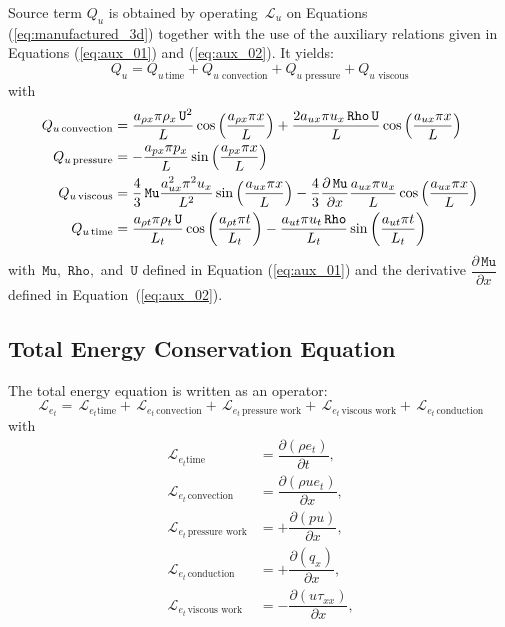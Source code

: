 \documentclass[10pt]{article}
\newcommand{\Diff}[2] {\dfrac{\partial( #1)}{\partial #2}}
\newcommand{\diff}[2] {\dfrac{\partial #1}{\partial #2}}
\newcommand{\Rho}{\,\mathtt{Rho}}
\newcommand{\U}{\,\mathtt{U}}
\newcommand{\Lo}{\,\mathcal{L}}
\newcommand{\Mu}{\,\mathtt{Mu}}
\newcommand{\DMuDx}{\diff{\Mu}{x}}
\newcommand{\timee}{\,\text{time}}
\newcommand{\convection}{\,\text{convection}}
\newcommand{\conduction}{\,\text{conduction}}
\newcommand{\workpressure}{\,\text{pressure work}}
\newcommand{\workviscous}{\,\text{viscous work}}
\newcommand{\viscous}{\,\text{viscous}}
\newcommand{\pressure}{\,\text{pressure}}
\begin{document}
Source term $Q_u$ is obtained by operating $\Lo_{u}$ on Equations  (\ref{eq:manufactured_3d}) together with the use of the  auxiliary relations given in Equations (\ref{eq:aux_01}) and (\ref{eq:aux_02}). It yields:
\begin{equation*}
Q_u = Q_{u \, \text{time}}+Q_{u \, \convection}+Q_{u \, \pressure }+Q_{u \, \viscous }
\end{equation*}
with
\begin{equation*}
\begin{split}
 Q_{u \convection} &= \dfrac{a_{\rho x} \pi \rho_x \U^2 }{L}\cos\left(\dfrac{a_{\rho x} \pi x}{L}\right) +\dfrac{2 a_{ux} \pi u_x \Rho \U}{L} \cos\left(\dfrac{a_{ux} \pi x}{L}\right) \\ 
%
Q_{u \pressure} &= -\dfrac{a_{px} \pi p_x}{L} \sin\left(\dfrac{a_{px} \pi x}{L}\right) \\ \vspace{15pt}
%
Q_{u \viscous} &= \dfrac{4}{3} \Mu \dfrac{a_{ux}^2 \pi^2 u_x }{L^2}\sin\left(\dfrac{a_{ux} \pi x}{L}\right)  -\dfrac{4}{3} \DMuDx \dfrac{a_{ux} \pi u_x }{L} \cos\left(\dfrac{a_{ux} \pi x}{L}\right) \\ \vspace{15pt}
%
Q_{u \timee} &= \dfrac{a_{\rho t} \pi \rho_t \U}{L_t} \cos\left(\dfrac{a_{\rho t} \pi t}{L_t}\right)-\dfrac{a_{ut} \pi u_t \Rho}{L_t} \sin\left(\dfrac{a_{ut} \pi t}{L_t}\right)
\end{split}
\end{equation*}
%
with $\Mu,\, \Rho,$ and $\U$  defined in Equation (\ref{eq:aux_01}) and the derivative $\DMuDx$   defined in Equation~(\ref{eq:aux_02}).




\subsection{Total Energy Conservation Equation}
The total energy equation is written as an operator:
\begin{equation*}
 \label{eq:ns1d_14}
\Lo_{e_t} = \Lo_{e_t \text{time}} + \Lo_{e_t \convection} + \Lo_{e_t \workpressure}+ \Lo_{e_t \workviscous} + \Lo_{e_t \conduction} 
\end{equation*}
with
\begin{equation*}
\begin{split}
\Lo_{e_t \text{time}}&= \Diff{\rho e_t}{t} ,\\
\Lo_{e_t \convection} &= \Diff{\rho u e_t}{x},\\
\Lo_{e_t \workpressure} &=+\Diff{pu}{x} ,\\
\Lo_{e_t \conduction} &=+\Diff{q_x}{x},\\ 
\Lo_{e_t \workviscous} &= -\Diff{u\tau_{xx}}{x},\\
 \end{split}
\end{equation*}
\end{document}
